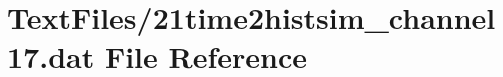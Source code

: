 \hypertarget{21time2histsim__channel17_8dat}{}\section{Text\+Files/21time2histsim\+\_\+channel17.dat File Reference}
\label{21time2histsim__channel17_8dat}
